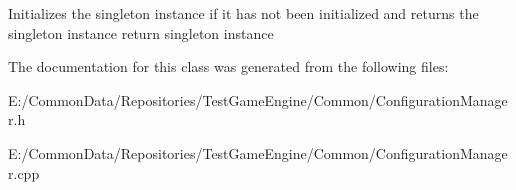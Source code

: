 Initializes the singleton instance if it has not been initialized and returns the singleton instance return singleton instance 

The documentation for this class was generated from the following files\+:\begin{DoxyCompactItemize}
\item 
E\+:/\+Common\+Data/\+Repositories/\+Test\+Game\+Engine/\+Common/Configuration\+Manager.\+h\item 
E\+:/\+Common\+Data/\+Repositories/\+Test\+Game\+Engine/\+Common/Configuration\+Manager.\+cpp\end{DoxyCompactItemize}
